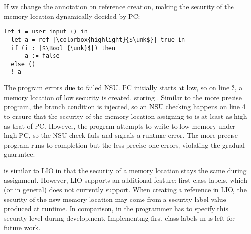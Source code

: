 {If we change the annotation on reference creation, making the security of the
memory location dynamically decided by PC:

\noindent
{}
\begin{lstlisting}[style=tt,basicstyle=\ttfamily\footnotesize]
  let i = user-input () in
  let a = ref |\colorbox{highlight}{$\unk$}| true in
  if (i : |$\Bool_{\unk}$|) then
      a := false
  else ()
  ! a
\end{lstlisting}

\noindent The  program errors due to failed NSU. PC
initially starts at low, so on line 2, a memory location of low security is
created, storing \true. Similar to the more precise program, the branch
condition is injected, so an NSU checking happens on line 4 to ensure that the
security of the memory location assigning to is at least as high as that of PC.
However, the program attempts to write to low memory under high PC, so the NSU
check fails and signals a runtime error. The more precise program runs to
completion but the less precise one errors, violating the gradual guarantee.

\DynIFC is similar to LIO in that the security of a memory location stays the
same during assignment. However, LIO supports an additional feature: first-class
labels, which \DynIFC (or \Surface in general) does not currently support. When
creating a reference in LIO, the security of the new memory location may come
from a security label value produced at runtime. In comparison, in \Surface the
programmer has to specify this security level during development. Implementing
first-class labels in \Surface is left for future work.

}  %
